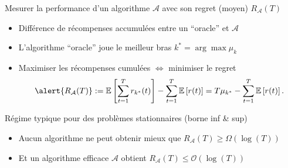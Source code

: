 \documentclass[11pt,english,ignorenonframetext,]{beamer}
\begin{document}
\begin{frame}{Mesurer la performance d'un algorithme $\mathcal{A}$ avec son regret (moyen) $R_{\mathcal{A}}(T)$}

\pause

\begin{itemize}
  \item
  Différence de récompenses accumulées entre un ``oracle'' et $\mathcal{A}$

  \item
  L'algorithme ``oracle'' joue le meilleur bras $k^* = \arg\max \mu_k$


  \item
  Maximiser les récompenses cumulées
  $\Longleftrightarrow$ \alert{minimiser le regret}
  \[ \alert{ R_{\mathcal{A}}(T) } := \mathbb{E}\left[ \sum\limits_{t=1}^T r_{k^*}(t) \right] - \sum\limits_{t=1}^T \mathbb{E}\left[ r(t) \right] = T \mu_{k^*} - \sum\limits_{t=1}^T \mathbb{E}\left[ r(t) \right]. \]

\end{itemize}

\pause
\vspace*{10pt}

\begin{exampleblock}{Régime typique pour des problèmes stationnaires (borne inf \& sup)}
  \begin{itemize}
  \item
  Aucun algorithme ne peut obtenir mieux que
  \hfill{}
  $R_{\mathcal{A}}(T) \geq \Omega(\log(T))$

  \item
  Et un algorithme efficace $\mathcal{A}$ obtient
  \hfill{}
  $R_{\mathcal{A}}(T) \leq \mathcal{O}(\log(T))$
  \end{itemize}
\end{exampleblock}



\end{frame}
\end{document}

